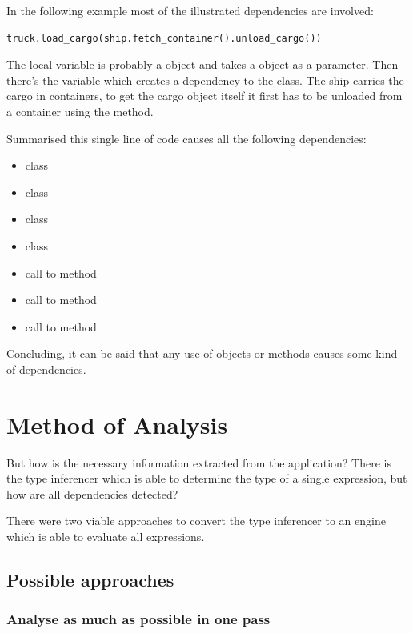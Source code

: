 \documentclass[12pt,halfparskip,DIV11,BCOR10mm]{scrreprt}
\begin{document}
In the following example most of the illustrated dependencies are involved:

\begin{lstlisting}
truck.load_cargo(ship.fetch_container().unload_cargo())
\end{lstlisting}

The local variable  is probably a  object and  takes a  object as a parameter. Then there's the  variable which creates a dependency to the  class. The ship carries the cargo in containers, to get the cargo object itself it first has to be unloaded from a container using the  method.

Summarised this single line of code causes all the following dependencies:

\begin{itemize}
    \item class 
    \item class 
    \item class 
    \item class 
    \item call to method 
    \item call to method 
    \item call to method 
\end{itemize}

Concluding, it can be said that any use of objects or methods causes some kind of dependencies.

\section{Method of Analysis}

But how is the necessary information extracted from the application? There is the type inferencer which is able to determine the type of a single expression, but how are all dependencies detected?

There were two viable approaches to convert the type inferencer to an engine which is able to evaluate all expressions. 

\subsection{Possible approaches}

\subsubsection{Analyse as much as possible in one pass}
\end{document}
